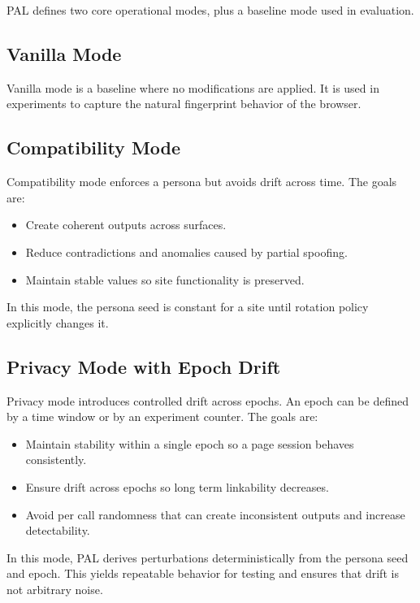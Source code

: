 \documentclass[11pt]{report}
\begin{document}
PAL defines two core operational modes, plus a baseline mode used in evaluation.

\subsection{Vanilla Mode}

Vanilla mode is a baseline where no modifications are applied. It is used in experiments to capture the natural fingerprint behavior of the browser.

\subsection{Compatibility Mode}

Compatibility mode enforces a persona but avoids drift across time. The goals are:

\begin{itemize}
    \item Create coherent outputs across surfaces.
    \item Reduce contradictions and anomalies caused by partial spoofing.
    \item Maintain stable values so site functionality is preserved.
\end{itemize}

In this mode, the persona seed is constant for a site until rotation policy explicitly changes it.

\subsection{Privacy Mode with Epoch Drift}

Privacy mode introduces controlled drift across epochs. An epoch can be defined by a time window or by an experiment counter. The goals are:

\begin{itemize}
    \item Maintain stability within a single epoch so a page session behaves consistently.
    \item Ensure drift across epochs so long term linkability decreases.
    \item Avoid per call randomness that can create inconsistent outputs and increase detectability.
\end{itemize}

In this mode, PAL derives perturbations deterministically from the persona seed and epoch. This yields repeatable behavior for testing and ensures that drift is not arbitrary noise.
\end{document}
